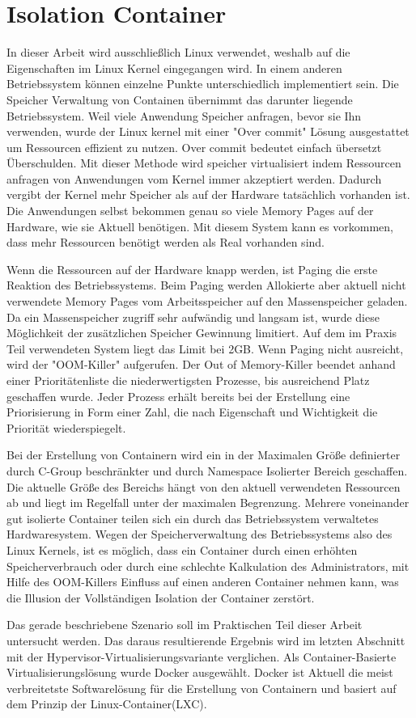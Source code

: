 \thispagestyle{empty}
\section{Isolation Container}

In dieser Arbeit wird ausschließlich Linux verwendet, weshalb auf die Eigenschaften im Linux Kernel eingegangen wird. In einem anderen Betriebssystem können einzelne Punkte unterschiedlich implementiert sein. Die Speicher Verwaltung von Containen übernimmt das darunter liegende Betriebssystem. Weil viele Anwendung Speicher anfragen, bevor sie Ihn verwenden, wurde der Linux kernel mit einer "Over commit" Lösung ausgestattet um Ressourcen effizient zu nutzen. Over commit bedeutet einfach übersetzt Überschulden. Mit dieser Methode wird speicher virtualisiert indem Ressourcen anfragen von Anwendungen vom Kernel immer akzeptiert werden. Dadurch vergibt der Kernel mehr Speicher als auf der Hardware tatsächlich vorhanden ist. Die Anwendungen selbst bekommen genau so viele Memory Pages auf der Hardware, wie sie Aktuell benötigen. Mit diesem System kann es vorkommen, dass mehr Ressourcen benötigt werden als Real vorhanden sind. 

Wenn die Ressourcen auf der Hardware knapp werden, ist Paging die erste Reaktion des Betriebssystems. Beim Paging werden Allokierte aber aktuell nicht verwendete Memory Pages vom Arbeitsspeicher auf den Massenspeicher geladen. Da ein Massenspeicher zugriff sehr aufwändig und langsam ist, wurde diese Möglichkeit der zusätzlichen Speicher Gewinnung limitiert. Auf dem im Praxis Teil verwendeten System liegt das Limit bei 2GB. Wenn Paging nicht ausreicht, wird der "OOM-Killer" aufgerufen. Der Out of Memory-Killer beendet anhand einer Prioritätenliste die niederwertigsten Prozesse, bis ausreichend Platz geschaffen wurde. Jeder Prozess erhält bereits bei der Erstellung eine Priorisierung in Form einer Zahl, die nach Eigenschaft und Wichtigkeit die Priorität wiederspiegelt.

Bei der Erstellung von Containern wird ein in der Maximalen Größe definierter durch C-Group beschränkter und durch Namespace Isolierter Bereich geschaffen. Die aktuelle Größe des Bereichs hängt von den aktuell verwendeten Ressourcen ab und liegt im Regelfall unter der maximalen Begrenzung. Mehrere voneinander gut isolierte Container teilen sich ein durch das Betriebssystem verwaltetes Hardwaresystem. Wegen der Speicherverwaltung des Betriebssystems also des Linux Kernels, ist es möglich, dass ein Container durch einen erhöhten Speicherverbrauch oder durch eine schlechte Kalkulation des Administrators, mit Hilfe des OOM-Killers Einfluss auf einen anderen Container nehmen kann, was die Illusion der Vollständigen Isolation der Container zerstört. 

Das gerade beschriebene Szenario soll im Praktischen Teil dieser Arbeit untersucht werden. Das daraus resultierende Ergebnis wird im letzten Abschnitt mit der Hypervisor-Virtualisierungsvariante verglichen. Als Container-Basierte Virtualisierungslösung wurde Docker ausgewählt. Docker ist Aktuell die meist verbreitetste  Softwarelösung für die Erstellung von Containern und basiert auf dem Prinzip der Linux-Container(LXC).


